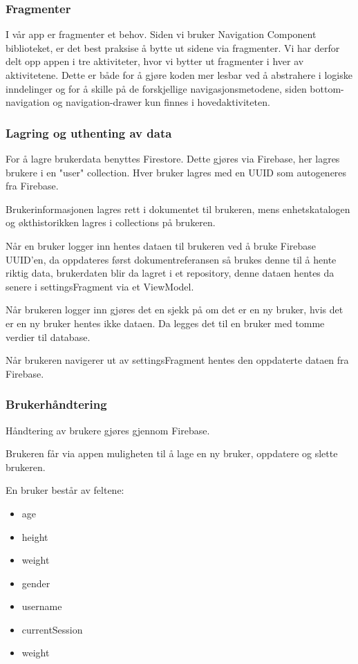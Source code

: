 \subsubsection{Fragmenter}
I vår app er fragmenter et behov. Siden vi bruker Navigation Component biblioteket, er det best praksise å bytte ut sidene via fragmenter. Vi har derfor delt opp appen i tre aktiviteter, hvor vi bytter ut fragmenter i hver av aktivitetene. Dette er både for å gjøre koden mer lesbar ved å abstrahere i logiske inndelinger og for å skille på de forskjellige navigasjonsmetodene, siden bottom-navigation og navigation-drawer kun finnes i hovedaktiviteten.

\subsubsection{Lagring og uthenting av data}
For å lagre brukerdata benyttes Firestore. Dette gjøres via Firebase, her lagres brukere i en "user" collection. Hver bruker lagres med en UUID som autogeneres fra Firebase. 

Brukerinformasjonen lagres rett i dokumentet til brukeren, mens enhetskatalogen og økthistorikken lagres i collections på brukeren. 

Når en bruker logger inn hentes dataen til brukeren ved å bruke Firebase UUID'en, da oppdateres først dokumentreferansen så brukes denne til å hente riktig data, brukerdaten blir da lagret i et repository, denne dataen hentes da senere i settingsFragment via et ViewModel. 

Når brukeren logger inn gjøres det en sjekk på om det er en ny bruker, hvis det er en ny bruker hentes ikke dataen. 
Da legges det til en bruker med tomme verdier til database. 

Når brukeren navigerer ut av settingsFragment hentes den oppdaterte dataen fra Firebase.

\subsubsection{Brukerhåndtering}
Håndtering av brukere gjøres gjennom Firebase.

Brukeren får via appen muligheten til å lage en ny bruker, oppdatere og slette brukeren.

En bruker består av feltene:
\begin{itemize}
    \item age
    \item height
    \item weight
    \item gender
    \item username
    \item currentSession
    \item weight
\end{itemize}

